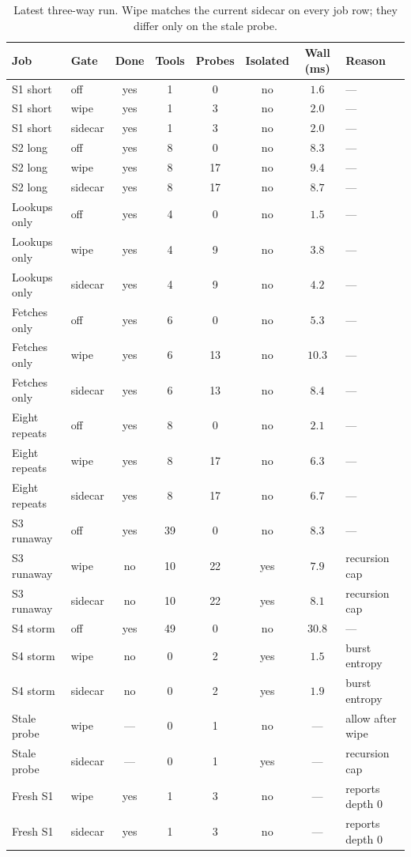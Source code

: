 \documentclass[11pt,a4paper]{article}
\begin{document}
\begin{table}[htbp]
\centering
\caption{Latest three-way run. Wipe matches the current sidecar on every job row; they differ only on the stale probe.}
\label{tab:full}
\scriptsize
\begin{tabular}{@{}llcccccl@{}}
\toprule
Job & Gate & Done & Tools & Probes & Isolated & Wall (ms) & Reason \\
\midrule
S1 short & off & yes & 1 & 0 & no & $1.6$ & --- \\
S1 short & wipe & yes & 1 & 3 & no & $2.0$ & --- \\
S1 short & sidecar & yes & 1 & 3 & no & $2.0$ & --- \\
S2 long & off & yes & 8 & 0 & no & $8.3$ & --- \\
S2 long & wipe & yes & 8 & 17 & no & $9.4$ & --- \\
S2 long & sidecar & yes & 8 & 17 & no & $8.7$ & --- \\
Lookups only & off & yes & 4 & 0 & no & $1.5$ & --- \\
Lookups only & wipe & yes & 4 & 9 & no & $3.8$ & --- \\
Lookups only & sidecar & yes & 4 & 9 & no & $4.2$ & --- \\
Fetches only & off & yes & 6 & 0 & no & $5.3$ & --- \\
Fetches only & wipe & yes & 6 & 13 & no & $10.3$ & --- \\
Fetches only & sidecar & yes & 6 & 13 & no & $8.4$ & --- \\
Eight repeats & off & yes & 8 & 0 & no & $2.1$ & --- \\
Eight repeats & wipe & yes & 8 & 17 & no & $6.3$ & --- \\
Eight repeats & sidecar & yes & 8 & 17 & no & $6.7$ & --- \\
S3 runaway & off & yes & 39 & 0 & no & $8.3$ & --- \\
S3 runaway & wipe & no & 10 & 22 & yes & $7.9$ & recursion cap \\
S3 runaway & sidecar & no & 10 & 22 & yes & $8.1$ & recursion cap \\
S4 storm & off & yes & 49 & 0 & no & $30.8$ & --- \\
S4 storm & wipe & no & 0 & 2 & yes & $1.5$ & burst entropy \\
S4 storm & sidecar & no & 0 & 2 & yes & $1.9$ & burst entropy \\
Stale probe & wipe & --- & 0 & 1 & no & --- & allow after wipe \\
Stale probe & sidecar & --- & 0 & 1 & yes & --- & recursion cap \\
Fresh S1 & wipe & yes & 1 & 3 & no & --- & reports depth $0$ \\
Fresh S1 & sidecar & yes & 1 & 3 & no & --- & reports depth $0$ \\
\bottomrule
\end{tabular}
\end{table}
\end{document}
